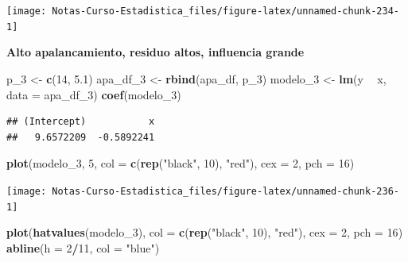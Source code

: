 \documentclass[
  12pt,
]{book}
\newenvironment{Shaded}{\begin{snugshade}}{\end{snugshade}}
\newcommand{\DataTypeTok}[1]{\textcolor[rgb]{0.13,0.29,0.53}{#1}}
\newcommand{\DecValTok}[1]{\textcolor[rgb]{0.00,0.00,0.81}{#1}}
\newcommand{\FloatTok}[1]{\textcolor[rgb]{0.00,0.00,0.81}{#1}}
\newcommand{\KeywordTok}[1]{\textcolor[rgb]{0.13,0.29,0.53}{\textbf{#1}}}
\newcommand{\NormalTok}[1]{#1}
\newcommand{\OperatorTok}[1]{\textcolor[rgb]{0.81,0.36,0.00}{\textbf{#1}}}
\newcommand{\StringTok}[1]{\textcolor[rgb]{0.31,0.60,0.02}{#1}}
\theoremstyle{definition}
\theoremstyle{definition}
\theoremstyle{definition}
\theoremstyle{remark}
\begin{document}
\begin{center}\texttt{[image: Notas-Curso-Estadistica\_files/figure-latex/unnamed-chunk-234-1]} \end{center}

\textbf{Alto apalancamiento, residuo altos, influencia grande}

\begin{Shaded}
\begin{Highlighting}[]
\NormalTok{p_}\DecValTok{3}\NormalTok{ <-}\StringTok{ }\KeywordTok{c}\NormalTok{(}\DecValTok{14}\NormalTok{, }\FloatTok{5.1}\NormalTok{)}
\NormalTok{apa_df_}\DecValTok{3}\NormalTok{ <-}\StringTok{ }\KeywordTok{rbind}\NormalTok{(apa_df, p_}\DecValTok{3}\NormalTok{)}
\NormalTok{modelo_}\DecValTok{3}\NormalTok{ <-}\StringTok{ }\KeywordTok{lm}\NormalTok{(y }\OperatorTok{~}\StringTok{ }\NormalTok{x, }\DataTypeTok{data =}\NormalTok{ apa_df_}\DecValTok{3}\NormalTok{)}
\KeywordTok{coef}\NormalTok{(modelo_}\DecValTok{3}\NormalTok{)}
\end{Highlighting}
\end{Shaded}

\begin{verbatim}
## (Intercept)           x 
##   9.6572209  -0.5892241
\end{verbatim}

\begin{Shaded}
\begin{Highlighting}[]
\KeywordTok{plot}\NormalTok{(modelo_}\DecValTok{3}\NormalTok{, }\DecValTok{5}\NormalTok{, }\DataTypeTok{col =} \KeywordTok{c}\NormalTok{(}\KeywordTok{rep}\NormalTok{(}\StringTok{"black"}\NormalTok{, }\DecValTok{10}\NormalTok{), }\StringTok{"red"}\NormalTok{), }
    \DataTypeTok{cex =} \DecValTok{2}\NormalTok{, }\DataTypeTok{pch =} \DecValTok{16}\NormalTok{)}
\end{Highlighting}
\end{Shaded}

\begin{center}\texttt{[image: Notas-Curso-Estadistica\_files/figure-latex/unnamed-chunk-236-1]} \end{center}

\begin{Shaded}
\begin{Highlighting}[]
\KeywordTok{plot}\NormalTok{(}\KeywordTok{hatvalues}\NormalTok{(modelo_}\DecValTok{3}\NormalTok{), }\DataTypeTok{col =} \KeywordTok{c}\NormalTok{(}\KeywordTok{rep}\NormalTok{(}\StringTok{"black"}\NormalTok{, }\DecValTok{10}\NormalTok{), }
    \StringTok{"red"}\NormalTok{), }\DataTypeTok{cex =} \DecValTok{2}\NormalTok{, }\DataTypeTok{pch =} \DecValTok{16}\NormalTok{)}
\KeywordTok{abline}\NormalTok{(}\DataTypeTok{h =} \DecValTok{2}\OperatorTok{/}\DecValTok{11}\NormalTok{, }\DataTypeTok{col =} \StringTok{"blue"}\NormalTok{)}
\end{Highlighting}
\end{Shaded}
\end{document}
